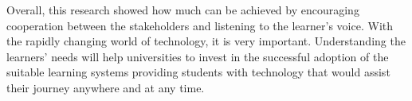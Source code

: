Overall, this research showed how much can be achieved by encouraging
cooperation between the stakeholders and listening to the learner's voice. With
the rapidly changing world of technology, it is very important. Understanding
the learners' needs will help universities to invest in the successful adoption
of the suitable learning systems providing students with technology that would
assist their \LLLs journey anywhere and at any time.

